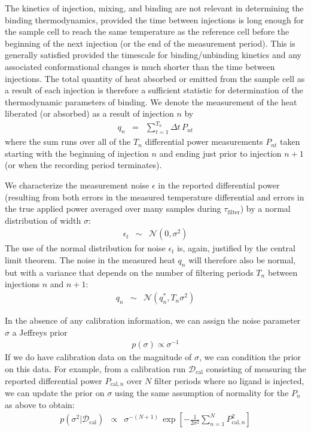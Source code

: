 \documentclass[aps,pre,twocolumn,nofootinbib,superscriptaddress,linenumbers]{revtex4-1}
\begin{document}
The kinetics of injection, mixing, and binding are not relevant in determining the binding thermodynamics, provided the time between injections is long enough for the sample cell to reach the same temperature as the reference cell before the beginning of the next injection (or the end of the measurement period).
This is generally satisfied provided the timescale for binding/unbinding kinetics and any associated conformational changes is much shorter than the time between injections.
The total quantity of heat absorbed or emitted from the sample cell as a result of each injection is therefore a sufficient statistic for determination of the thermodynamic parameters of binding.
We denote the measurement of the heat liberated (or absorbed) as a result of injection $n$ by
\begin{eqnarray}
q_n &=& \sum_{t=1}^{T_n} \Delta t \, P_{nt}
\end{eqnarray}
where the sum runs over all of the $T_n$ differential power measurements $P_{nt}$ taken starting with the beginning of injection $n$ and ending just prior to injection $n+1$ (or when the recording period terminates).

We characterize the measurement noise $\epsilon$ in the reported differential power (resulting from both errors in the measured temperature differential and errors in the true applied power averaged over many samples during $\tau_\mathrm{filter}$) by a normal distribution of width $\sigma$:
\begin{eqnarray}
\epsilon_t &\sim& \mathcal{N}(0, \sigma^2)
 \end{eqnarray}
The use of the normal distribution for noise $\epsilon_t$ is, again, justified by the central limit theorem.
The noise in the measured heat $q_n$ will therefore also be normal, but with a variance that depends on the number of filtering periods $T_n$ between injections $n$ and $n+1$:
\begin{eqnarray}
q_n &\sim& \mathcal{N}(q_n^*, T_n \sigma^2)
\end{eqnarray}

In the absence of any calibration information, we can assign the noise parameter $\sigma$ a Jeffreys prior~\cite{jeffreys:1946a}
\begin{eqnarray}
p(\sigma) \propto \sigma^{-1}
\end{eqnarray}
If we do have calibration data on the magnitude of $\sigma$, we can condition the prior on this data.
For example, from a calibration run $\mathcal{D}_\mathrm{cal}$ consisting of measuring the reported differential power $P_{\mathrm{cal},n}$ over $N$ filter periods where no ligand is injected, we can update the prior on $\sigma$ using the same assumption of normality for the $P_n$ as above to obtain:
\begin{eqnarray}
p(\sigma^2 | \mathcal{D}_\mathrm{cal}) &\propto& \sigma^{-(N+1)} \, \exp\left[-\frac{1}{2 \sigma^2} \sum_{n=1}^N P_{\mathrm{cal},n}^2\right] 
\end{eqnarray}
\end{document}
